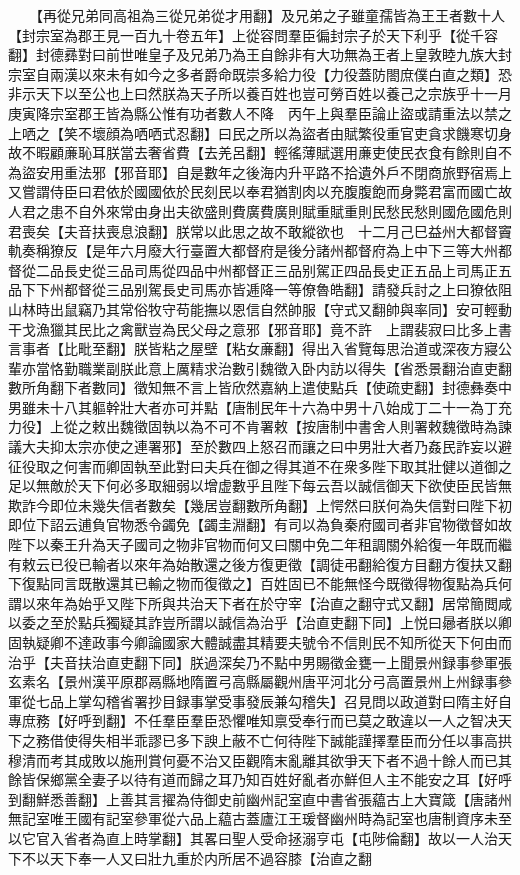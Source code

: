 　　【再從兄弟同高祖為三從兄弟從才用翻】及兄弟之子雖童孺皆為王王者數十人【封宗室為郡王見一百九十卷五年】上從容問羣臣徧封宗子於天下利乎【從千容翻】封德彞對曰前世唯皇子及兄弟乃為王自餘非有大功無為王者上皇敦睦九族大封宗室自兩漢以來未有如今之多者爵命既崇多給力役【力役蓋防閤庶僕白直之類】恐非示天下以至公也上曰然朕為天子所以養百姓也豈可勞百姓以養己之宗族乎十一月庚寅降宗室郡王皆為縣公惟有功者數人不降　丙午上與羣臣論止盜或請重法以禁之上哂之【笑不壞顔為哂哂式忍翻】曰民之所以為盜者由賦繁役重官吏貪求饑寒切身故不暇顧亷恥耳朕當去奢省費【去羌呂翻】輕徭薄賦選用亷吏使民衣食有餘則自不為盜安用重法邪【邪音耶】自是數年之後海内升平路不拾遺外戶不閉商旅野宿焉上又嘗謂侍臣曰君依於國國依於民刻民以奉君猶割肉以充腹腹飽而身斃君富而國亡故人君之患不自外來常由身出夫欲盛則費廣費廣則賦重賦重則民愁民愁則國危國危則君喪矣【夫音扶喪息浪翻】朕常以此思之故不敢縱欲也　十二月己巳益州大都督竇軌奏稱獠反【是年六月廢大行臺置大都督府是後分諸州都督府為上中下三等大州都督從二品長史從三品司馬從四品中州都督正三品别駕正四品長史正五品上司馬正五品下下州都督從三品别駕長史司馬亦皆逓降一等僚魯皓翻】請發兵討之上曰獠依阻山林時出鼠竊乃其常俗牧守苟能撫以恩信自然帥服【守式又翻帥與率同】安可輕動干戈漁獵其民比之禽獸豈為民父母之意邪【邪音耶】竟不許　上謂裴寂曰比多上書言事者【比毗至翻】朕皆粘之屋壁【粘女亷翻】得出入省覽每思治道或深夜方寢公輩亦當恪勤職業副朕此意上厲精求治數引魏徵入卧内訪以得失【省悉景翻治直吏翻數所角翻下者數同】徵知無不言上皆欣然嘉納上遣使點兵【使疏吏翻】封德彝奏中男雖未十八其軀幹壯大者亦可并點【唐制民年十六為中男十八始成丁二十一為丁充力役】上從之敕出魏徵固執以為不可不肯署敕【按唐制中書舍人則署敕魏徵時為諫議大夫抑太宗亦使之連署邪】至於數四上怒召而讓之曰中男壯大者乃姦民詐妄以避征役取之何害而卿固執至此對曰夫兵在御之得其道不在衆多陛下取其壯健以道御之足以無敵於天下何必多取細弱以增虚數乎且陛下每云吾以誠信御天下欲使臣民皆無欺詐今即位未幾失信者數矣【幾居豈翻數所角翻】上愕然曰朕何為失信對曰陛下初即位下詔云逋負官物悉令蠲免【蠲圭淵翻】有司以為負秦府國司者非官物徵督如故陛下以秦王升為天子國司之物非官物而何又曰關中免二年租調關外給復一年既而繼有敕云已役已輸者以來年為始散還之後方復更徵【調徒弔翻給復方目翻方復扶又翻下復點同言既散還其已輸之物而復徵之】百姓固已不能無怪今既徵得物復點為兵何謂以來年為始乎又陛下所與共治天下者在於守宰【治直之翻守式又翻】居常簡閲咸以委之至於點兵獨疑其詐豈所謂以誠信為治乎【治直吏翻下同】上悦曰曏者朕以卿固執疑卿不達政事今卿論國家大體誠盡其精要夫號令不信則民不知所從天下何由而治乎【夫音扶治直吏翻下同】朕過深矣乃不點中男賜徵金甕一上聞景州録事參軍張玄素名【景州漢平原郡鬲縣地隋置弓高縣屬觀州唐平河北分弓高置景州上州録事參軍從七品上掌勾稽省署抄目録事掌受事發辰兼勾稽失】召見問以政道對曰隋主好自專庶務【好呼到翻】不任羣臣羣臣恐懼唯知禀受奉行而已莫之敢違以一人之智决天下之務借使得失相半乖謬已多下諛上蔽不亡何待陛下誠能謹擇羣臣而分任以事高拱穆清而考其成敗以施刑賞何憂不治又臣觀隋末亂離其欲爭天下者不過十餘人而已其餘皆保鄉黨全妻子以待有道而歸之耳乃知百姓好亂者亦鮮但人主不能安之耳【好呼到翻鮮悉善翻】上善其言擢為侍御史前幽州記室直中書省張藴古上大寶箴【唐諸州無記室唯王國有記室參軍從六品上藴古蓋廬江王瑗督幽州時為記室也唐制資序未至以它官入省者為直上時掌翻】其畧曰聖人受命拯溺亨屯【屯陟倫翻】故以一人治天下不以天下奉一人又曰壯九重於内所居不過容膝【治直之翻